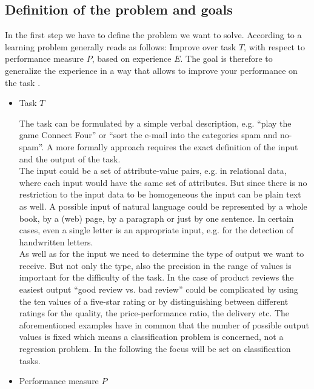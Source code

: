 \documentclass[article,type=msc,colorback,accentcolor=tud7b]{tudthesis}
\begin{document}
  \subsection{Definition of the problem and goals}
  \label{subsec:definition_of_the_problem_and_goals}
    In the first step we have to define the problem we want to solve. According to \citeauthor{Mitchell1997} a learning problem generally reads as follows: Improve over task $T$, with respect to performance measure $P$, based on experience $E$. The goal is therefore to generalize the experience in a way that allows to improve your performance on the task \autocite[Chapter~1]{Mitchell1997}.
    \begin{itemize}
      \item Task $T$
      
        The task can be formulated by a simple verbal description, e.g. “play the game Connect Four” or “sort the e-mail into the categories spam and no-spam”. A more formally approach requires the exact definition of the input and the output of the task. \\
        The input could be a set of attribute-value pairs, e.g. in relational data, where each input would have the same set of attributes. But since there is no restriction to the input data to be homogeneous the input can be plain text as well. A possible input of natural language could be represented by a whole book, by a (web) page, by a paragraph or just by one sentence. In certain cases, even a single letter is an appropriate input, e.g. for the detection of handwritten letters. \\
        As well as for the input we need to determine the type of output we want to receive. But not only the type, also the precision in the range of values is important for the difficulty of the task. In the case of product reviews the easiest output “good review vs. bad review” could be complicated by using the ten values of a five-star rating or by distinguishing between different ratings for the quality, the price-performance ratio, the delivery etc. The aforementioned examples have in common that the number of possible output values is fixed which means a classification problem is concerned, not a regression problem. In the following the focus will be set on classification tasks.
      \item Performance measure $P$
      

\end{itemize}
\end{document}
